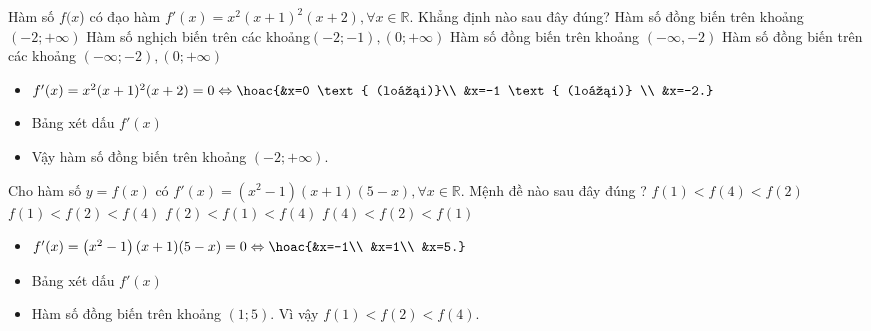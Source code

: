 \begin{ex}%
 Hàm số $f(x$) có đạo hàm $f'(x)=x^2(x+1)^2(x+2),\forall x\in\mathbb{R}$. Khẳng định nào sau đây đúng?
 \choice
 {\True Hàm số đồng biến trên khoảng $(-2 ;+\infty)$}
 {Hàm số nghịch biến trên các khoảng$(-2 ;-1),(0 ;+\infty)$ }
 {Hàm số đồng biến trên khoảng $(-\infty,-2)$}
 {Hàm số đồng biến trên các khoảng $(-\infty ;-2),(0 ;+\infty)$}
 \loigiai
 {
 \begin{itemize}
 \item 	$f'(x)= x^2(x+1)^2(x+2)=0 \Leftrightarrow \hoac{&x=0 \text{ (loại)}\\ &x=-1 \text{ (loại)} \\ &x=-2.} $
 \item Bảng xét dấu $f'(x)$
 \begin{center}
 \end{center}
 \item Vậy hàm số đồng biến trên khoảng $(-2 ;+\infty)$.
 \end{itemize}
 }
\end{ex}
\begin{ex}%
 Cho hàm số $ y = f(x)$ có $f'(x)=\left(x^2-1\right)(x+1)(5-x), \forall x\in\mathbb{R}$. Mệnh đề nào sau đây đúng ?
 \choice
 {$f(1)<f(4)<f(2)$}
 {\True $f(1)<f(2)<f(4)$}
 {$f(2)<f(1)<f(4)$}
 {$f(4)<f(2)<f(1)$}
 \loigiai
 {
 \begin{itemize}
 \item $f'(x)=\left(x^2-1\right)(x+1)(5-x)=0 \Leftrightarrow \hoac{&x=-1\\ &x=1\\ &x=5.} $
 \item Bảng xét dấu $f'(x)$
 \begin{center}
 \end{center}
 \item 	Hàm số đồng biến trên khoảng $(1 ; 5)$. Vì vậy $f(1)<f(2)<f(4)$.
 \end{itemize}
 }
\end{ex}
